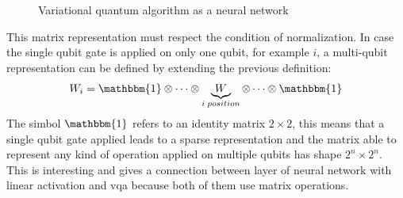 \begin{center}
	\begin{figure}[!h]
		\centering
		\caption{Variational quantum algorithm as a neural network}
		\label{vqa nn}
	\end{figure}
\end{center}
This matrix representation must respect the condition of normalization. In case the single qubit gate is applied on only one qubit, for example $i$, a multi-qubit representation can be defined by extending the previous definition:
\begin{equation*}
	W_i = \mathbbm{1} \otimes \dots \otimes \underbrace{W}_{i\;position} \otimes \dots \otimes \mathbbm{1}
\end{equation*}
The simbol $\mathbbm{1}$ refers to an identity matrix $2\times2$, this means that a single qubit gate applied leads to a sparse representation and the matrix able to represent any kind of operation applied on multiple qubits has shape $2^n \times 2^n$. This is interesting and gives a connection between layer of neural network with linear activation and vqa because both of them use matrix operations.
